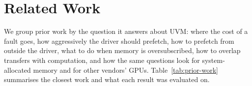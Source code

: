 %
%
%
%

\section{Related Work}
\label{sec:related}

We group prior work by the question it answers about UVM: where the cost of
a fault goes, how aggressively the driver should prefetch, how to prefetch
from outside the driver, what to do when memory is oversubscribed, how to
overlap transfers with computation, and how the same questions look for
system-allocated memory and for other vendors' GPUs. Table~\ref{tab:prior-work}
summarises the closest work and what each result was evaluated on.

